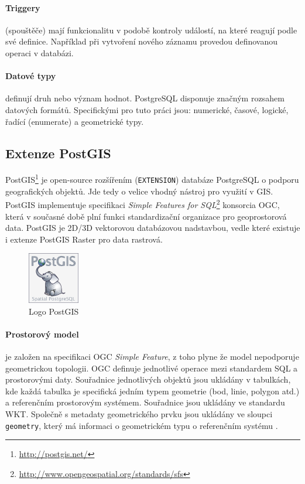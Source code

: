 \documentclass[a4paper,12pt,oneside]{report}
\begin{document}
\paragraph*{Triggery} (spouštěče) mají funkcionalitu v podobě kontroly
událostí, na které reagují podle své definice. Například při vytvoření
nového záznamu provedou definovanou operaci v databázi.

\paragraph*{Datové typy} definují druh nebo význam hodnot.
PostgreSQL disponuje značným rozsahem datových formátů. Specifickými pro tuto
práci jsou: numerické, časové, logické, řadící (enumerate) a
geometrické typy.

\subsection{Extenze PostGIS}
PostGIS\footnote{\url{http://postgis.net/}} je open-source rozšířením
(\texttt{EXTENSION}) databáze PostgreSQL o podporu geografických
objektů. Jde tedy o velice vhodný nástroj pro využití v GIS. PostGIS
implementuje specifikaci \textit{Simple Features for
  SQL}\footnote{\url{http://www.opengeospatial.org/standards/sfs} }
konsorcia \acs{OGC}, která v současné době plní funkci standardizační
organizace pro geoprostorová data. PostGIS je 2D/3D vektorovou
databázovou nadstavbou, vedle které existuje i extenze PostGIS Raster pro data rastrová.

  
\begin{figure}[h!]
    \centering
    \includegraphics[width=0.2\textwidth]{./img/implementace/postgis.png}
    \caption[Logo PostGIS]{\centering  Logo PostGIS \footnotemark}
 \end{figure}   

\paragraph*{Prostorový model} 
je založen na specifikaci    \acs{OGC} \textit{Simple Feature}, z toho
plyne že model nepodporuje geometrickou topologii. OGC definuje
jednotlivé operace mezi standardem SQL a prostorovými daty. Souřadnice
jednotlivých objektů jsou ukládány v tabulkách, kde každá tabulka je
specifická jedním typem geometrie (bod, linie, polygon atd.) a
referenčním prostorovým systémem. Souřadnice jsou ukládány ve
standardu    \acs{WKT}. Společně s metadaty  geometrického prvku jsou
ukládány ve sloupci \texttt{geometry}, který má informaci o
geometrickém typu o referenčním systému \cite{postgis}.
\end{document}
